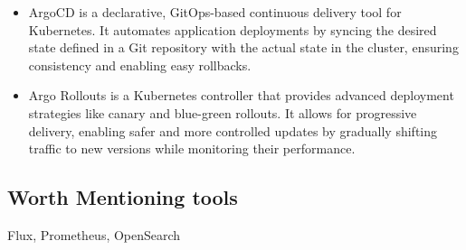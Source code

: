 \begin{itemize}
    \item ArgoCD
     is a declarative, GitOps-based continuous delivery tool for Kubernetes.
     It automates application deployments by syncing the desired state
    defined in a Git repository with the actual state in the cluster,
    ensuring consistency and enabling easy rollbacks.

    \item Argo Rollouts
     is a Kubernetes controller that provides advanced deployment strategies
     like canary and blue-green rollouts. It allows for progressive
    delivery, enabling safer and more controlled updates by gradually
    shifting traffic to new versions while monitoring their performance.
\end{itemize}


\subsection{Worth Mentioning tools}
Flux, Prometheus, OpenSearch